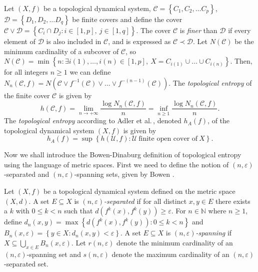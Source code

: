\begin{defn}
    Let $(X, f)$ be a topological dynamical system, $\mathcal{C} = \left\lbrace C_1, C_2, \dots C_p \right\rbrace$, $\mathcal{D} = \left\lbrace D_1, D_2, \dots D_q \right\rbrace$ be finite covers and define the cover $\mathcal{C} \vee \mathcal{D} = \left\lbrace C_i \cap D_j : i \in [1, p], \ j \in [1, q] \right\rbrace$. The cover $\mathcal{C}$ is \emph{finer} than $\mathcal{D}$ if every element of $\mathcal{D}$ is also included in $\mathcal{C}$, and is expressed as $\mathcal{C} \prec \mathcal{D}$. Let $N(\mathcal{C})$ be the minimum cardinality of a subcover of $\mathcal{C}$, so $N(\mathcal{C}) = \min \left\lbrace n : \exists i(1), \dots, i(n) \in [1, p],\ X = C_{i(1)} \cup \dots \cup C_{i(n)}\right\rbrace$. Then, for all integers $n \geq 1$ we can define $N_n(\mathcal{C}, f) = N\left(\mathcal{C} \vee f^{-1}(\mathcal{C}) \vee \dots \vee f^{-(n-1)}(\mathcal{C})\right)$. The \emph{topological entropy} of the finite cover $\mathcal{C}$ is given by \[h(\mathcal{C}, f) = \lim_{n \to +\infty}\frac{\log{N_n(\mathcal{C}, f)}}{n} = \inf_{n \geq 1} \frac{\log{N_n(\mathcal{C}, f)}}{n}.\] The \emph{topological entropy} according to Adler et al.\,, denoted $h_A(f)$, of the topological dynamical system $(X, f)$ is given by \[h_{A}(f) = \sup\left\lbrace h(\mathcal{U}, f): \mathcal{U} \ \text{finite open cover of} \ X \right\rbrace.\]
\end{defn}

Now we shall introduce the Bowen-Dinaburg definition of topological entropy using the language of metric spaces. First we need to define the notion of $(n, \varepsilon)$-separated and $(n, \varepsilon)$-spanning sets, given by Bowen \cite{bowen}.

\begin{defn}
    Let $(X, f)$ be a topological dynamical system defined on the metric space $(X, d)$. A set $E \subseteq X$ is \emph{$(n, \varepsilon)$-separated} if for all distinct $x, y \in E$ there exists a $k$ with $0 \leq k < n$ such that $d(f^k(x), f^k(y)) \geq \varepsilon$. For $n \in \mathbb{N}$ where $n \geq 1$, define $d_n(x, y) = \max{\left\lbrace d(f^k(x), f^k(y)) : 0 \leq k < n \right\rbrace}$ and $B_n(x, \varepsilon) = \left\lbrace y \in X : d_n(x, y) < \varepsilon \right\rbrace$. A set $E \subseteq X$ is \emph{$(n, \varepsilon)$-spanning} if $X \subseteq \bigcup_{x \in E}B_n(x, \varepsilon)$. Let $r(n, \varepsilon)$ denote the minimum cardinality of an $(n, \varepsilon)$-spanning set and $s(n, \varepsilon)$ denote the maximum cardinality of an $(n, \varepsilon)$-separated set.
\end{defn}

